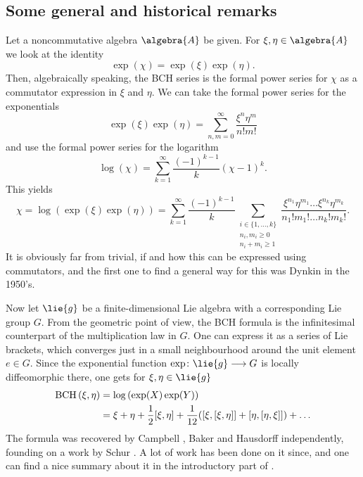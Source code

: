 \subsection{Some general and historical remarks}
Let a noncommutative algebra $\algebra{A}$ be given. For $\xi, \eta \in 
\algebra{A}$ we look at the identity
\begin{equation*}
	\exp(\chi)
	=
	\exp(\xi)
	\exp(\eta).
\end{equation*}
Then, algebraically speaking, the BCH series is the formal power series for 
$\chi$ as a commutator expression in $\xi$ and $\eta$. We can take the formal 
power series for the exponentials
\begin{equation*}
	\exp(\xi)\exp(\eta) 
	= 
	\sum\limits_{n,m=0}^{\infty} 
	\frac{\xi^n \eta^m}{n! m!}
\end{equation*}
and use the formal power series for the logarithm
\begin{equation*}
	\log(\chi) 
	= 
	\sum\limits_{k = 1}^{\infty} 
	\frac{ (-1)^{k-1} }{ k } (\chi - 1)^k.
\end{equation*}
This yields
\begin{equation}
	\label{Alg:BCHinRaw}
	\chi
	= 
	\log \left( \exp(\xi) \exp(\eta) \right) 
	= 
	\sum\limits_{k = 1}^{\infty} 
	\frac{ (-1)^{k - 1} }{k} 
	\sum\limits_{ \substack{ 
		i \in \{1, \ldots, k\} \\ 
		n_i, m_i \geq 0 \\ n_i + m_i \geq 1
	}}
	\frac{
		\xi^{n_1} \eta^{m_1} 
		\ldots 
		\xi^{n_k} \eta^{m_k}
	}
	{n_1! m_1! \ldots n_k! m_k!}.
\end{equation}
It is obviously far from trivial, if and how this can be expressed using 
commutators, and the first one to find a general way for this was Dynkin in 
the 1950's.


Now let $\lie{g}$ be a finite-dimensional Lie algebra with a corresponding Lie 
group $G$. From the geometric point of view, the BCH formula is the 
infinitesimal counterpart of the multiplication law in $G$. One can express it 
as a series of Lie brackets, which converges just in a small neighbourhood 
around the unit element $e \in G$. Since the exponential function  $\exp 
\colon \lie{g} \longrightarrow G$ is locally diffeomorphic there, one gets for 
$\xi, \eta \in \lie{g}$
\begin{align*}
	\mathrm{BCH}\left(\xi, \eta\right)
	& =
	\log \left( \exp(X) \exp(Y) \right)
	\\
	& =
	\xi + \eta
	+ \frac{1}{2} [\xi, \eta]
	+ \frac{1}{12} ( [\xi, [\xi, \eta]] + [\eta, [\eta, \xi]] )
	+ \ldots
\end{align*}
The formula was recovered by Campbell \cite{campb1, campb2}, Baker 
\cite{baker} and Hausdorff \cite{hausd} independently, founding on a work by 
Schur \cite{schur}. A lot of work has been done on it since, and one can find 
a nice summary about it in the introductory part of \cite{casmur}.


